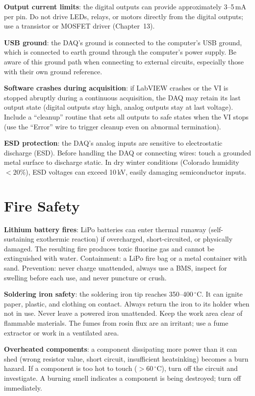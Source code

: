 \documentclass[11pt,letterpaper,twoside,openany]{book}
\newcommand{\degC}{\ensuremath{{}^{\circ}\text{C}}}
\begin{document}
\textbf{Output current limits}: the digital outputs can provide approximately 3--5\,mA per pin. Do not drive LEDs, relays, or motors directly from the digital outputs; use a transistor or MOSFET driver (Chapter~13).

\textbf{USB ground}: the DAQ's ground is connected to the computer's USB ground, which is connected to earth ground through the computer's power supply. Be aware of this ground path when connecting to external circuits, especially those with their own ground reference.

\textbf{Software crashes during acquisition}: if LabVIEW crashes or the VI is stopped abruptly during a continuous acquisition, the DAQ may retain its last output state (digital outputs stay high, analog outputs stay at last voltage). Include a ``cleanup'' routine that sets all outputs to safe states when the VI stops (use the ``Error'' wire to trigger cleanup even on abnormal termination).

\textbf{ESD protection}: the DAQ's analog inputs are sensitive to electrostatic discharge (ESD). Before handling the DAQ or connecting wires: touch a grounded metal surface to discharge static. In dry winter conditions (Colorado humidity $< 20\%$), ESD voltages can exceed 10\,kV, easily damaging semiconductor inputs.

\section*{Fire Safety}
\textbf{Lithium battery fires}: LiPo batteries can enter thermal runaway (self-sustaining exothermic reaction) if overcharged, short-circuited, or physically damaged. The resulting fire produces toxic fluorine gas and cannot be extinguished with water. Containment: a LiPo fire bag or a metal container with sand. Prevention: never charge unattended, always use a BMS, inspect for swelling before each use, and never puncture or crush.

\textbf{Soldering iron safety}: the soldering iron tip reaches 350--400\,\degC{}. It can ignite paper, plastic, and clothing on contact. Always return the iron to its holder when not in use. Never leave a powered iron unattended. Keep the work area clear of flammable materials. The fumes from rosin flux are an irritant; use a fume extractor or work in a ventilated area.

\textbf{Overheated components}: a component dissipating more power than it can shed (wrong resistor value, short circuit, insufficient heatsinking) becomes a burn hazard. If a component is too hot to touch ($> 60$\,\degC{}), turn off the circuit and investigate. A burning smell indicates a component is being destroyed; turn off immediately.
\end{document}
